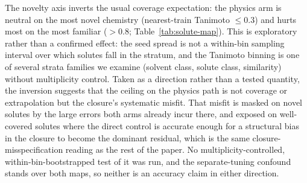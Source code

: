 The novelty axis inverts the usual coverage expectation: the physics arm is neutral on the most novel chemistry (nearest-train Tanimoto $\leq0.3$) and hurts most on the most familiar ($>0.8$; Table~\ref{tab:solute-map}). This is exploratory rather than a confirmed effect: the seed spread is not a within-bin sampling interval over which solutes fall in the stratum, and the Tanimoto binning is one of several strata families we examine (solvent class, solute class, similarity) without multiplicity control. Taken as a direction rather than a tested quantity, the inversion suggests that the ceiling on the physics path is not coverage or extrapolation but the closure's systematic misfit. That misfit is masked on novel solutes by the large errors both arms already incur there, and exposed on well-covered solutes where the direct control is accurate enough for a structural bias in the closure to become the dominant residual, which is the same closure-misspecification reading as the rest of the paper. No multiplicity-controlled, within-bin-bootstrapped test of it was run, and the separate-tuning confound stands over both maps, so neither is an accuracy claim in either direction.
